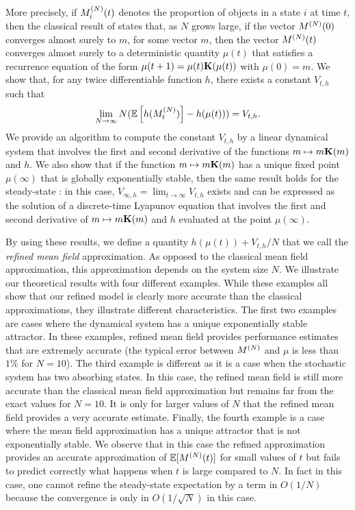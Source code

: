 \documentclass{elsarticle}
\begin{document}
More precisely, if $M^{(N)}_i(t)$ denotes the proportion of objects in a
state $i$ at time $t$, then the classical result of \cite{Le+07}
states that, as $N$ grows large, if the vector $M^{(N)}(0)$ converges almost surely
to $m$, for some vector $m$, then the vector $M^{(N)}(t)$ converges almost
surely to a deterministic quantity $\mu(t)$ that satisfies a
recurrence equation of the form $\mu(t+1)=\mu(t)\mathbf{K}(\mu(t))$ with
$\mu(0)=m$. We show that, for any twice differentiable function $h$, there
exists a constant $V_{t,h}$ such that
\begin{align}
  \label{eq:main_result}
  \lim_{N\to\infty} N(\esp{h(\MN_t)} - h(\mu(t))) = V_{t,h}.
\end{align}
We provide an algorithm to compute the constant $V_{t,h}$ by a linear
dynamical system that involves the first and second derivative of the
functions $m\mapsto m\mathbf{K}(m)$ and $h$.  We also show that if the function
$m\mapsto m\mathbf{K}(m)$ has a unique fixed point $\mu(\infty)$ that is
globally exponentially stable, then the same result holds for the
steady-state : in this case, $V_{\infty,h}=\lim_{t\to\infty}V_{t,h}$
exists and can be expressed as the solution of a discrete-time
Lyapunov equation that involves the first and second derivative of
$m\mapsto m\mathbf{K}(m)$ and $h$ evaluated at the point $\mu(\infty)$.

By using these results, we define a quantity $h(\mu(t))+V_{t,h}/N$
that we call the \emph{refined mean field} approximation. As opposed
to the classical mean field approximation, this approximation depends
on the system size $N$. We illustrate our theoretical results with
four different examples. While these examples all show that our
refined model is clearly more accurate than the classical
approximations, they illustrate different characteristics. The first
two examples are cases where the dynamical system has a unique
exponentially stable attractor. In these examples, refined mean field
provides performance estimates that are extremely accurate (the
typical error between $M^{(N)}$ and $\mu$ is less than $1\%$ for
$N=10$). The third example is different as it is a case when the
stochastic system has two absorbing states. In this case, the refined
mean field is still more accurate than the classical mean field
approximation but remains far from the exact values for $N=10$.  It is
only for larger values of $N$ that the refined mean field provides a
very accurate estimate. Finally, the fourth example is a case where
the mean field approximation has a unique attractor that is not
exponentially stable. We observe that in this case the refined
approximation provides an accurate approximation of $\esp{\MN(t)}$ for
small values of $t$ but fails to predict correctly what happens when
$t$ is large compared to $N$. In fact in this case, one cannot refine
the steady-state expectation by a term in $O(1/N)$ because the
convergence is only in $O(1/\sqrt{N})$ in this case.
\end{document}
